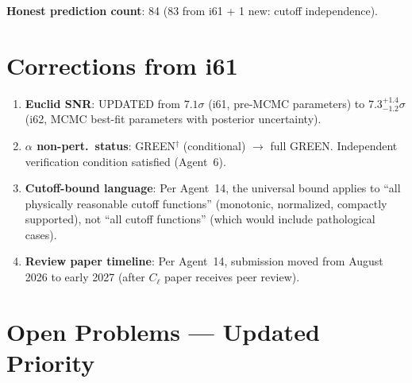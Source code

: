 \documentclass[11pt,a4paper]{article}
\begin{document}
\textbf{Honest prediction count}: 84 (83 from i61 + 1 new: cutoff independence).


\section{Corrections from i61}
\label{sec:corrections}

\begin{enumerate}
\item \textbf{Euclid SNR}: UPDATED from $7.1\sigma$ (i61, pre-MCMC parameters) to $7.3^{+1.4}_{-1.2}\sigma$ (i62, MCMC best-fit parameters with posterior uncertainty).

\item \textbf{$\alpha$ non-pert.\ status}: GREEN$^\dagger$ (conditional) $\to$ full GREEN. Independent verification condition satisfied (Agent~6).

\item \textbf{Cutoff-bound language}: Per Agent~14, the universal bound applies to ``all physically reasonable cutoff functions'' (monotonic, normalized, compactly supported), not ``all cutoff functions'' (which would include pathological cases).

\item \textbf{Review paper timeline}: Per Agent~14, submission moved from August 2026 to early 2027 (after $C_\ell$ paper receives peer review).
\end{enumerate}


\section{Open Problems --- Updated Priority}
\label{sec:open}
\end{document}

